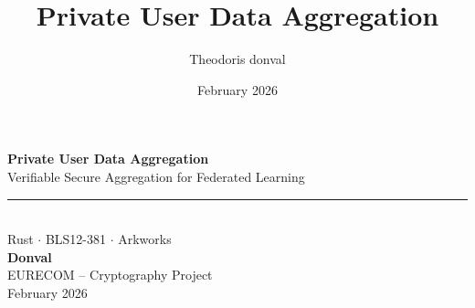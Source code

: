 \documentclass[aspectratio=169,10pt]{beamer}
\title[PUDA]{Private User Data Aggregation}
\subtitle{}
\author[T. Donval]{Theodoris donval}
\institute[EURECOM]{EURECOM Project -- Fall 2025}
\date{February 2026}
\begin{document}
\begin{frame}[plain]
    \vspace{1.5cm}
    \begin{center}
        {\LARGE\bfseries\textcolor{primary}{Private User Data Aggregation}}\\[8pt]
        {\large\textcolor{secondary}{Verifiable Secure Aggregation for Federated Learning}}\\[20pt]
        \textcolor{accent}{\rule{5cm}{1.5pt}}\\[20pt]
        {\normalsize Rust $\cdot$ BLS12-381 $\cdot$ Arkworks}\\[30pt]
        {\large\textbf{Donval}}\\[5pt]
        {\small EURECOM -- Cryptography Project}\\[3pt]
        {\small February 2026}
    \end{center}
\end{frame}
\end{document}
